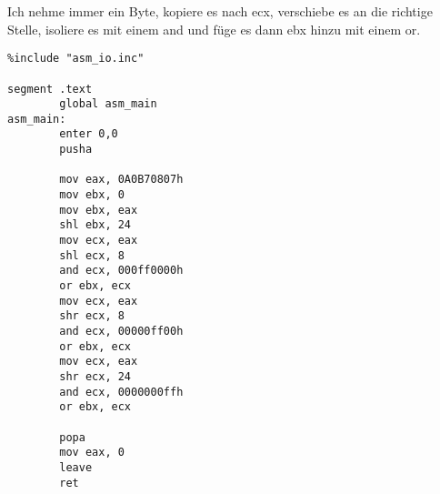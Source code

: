 \documentclass[10pt,a4paper]{article}
\begin{document}
Ich nehme immer ein Byte, kopiere es nach ecx, verschiebe es an die richtige Stelle, isoliere es mit einem and und füge es dann ebx hinzu mit einem or.
\begin{lstlisting}
%include "asm_io.inc"

segment .text
        global asm_main
asm_main:
        enter 0,0
        pusha

        mov eax, 0A0B70807h
        mov ebx, 0
        mov ebx, eax
        shl ebx, 24
        mov ecx, eax
        shl ecx, 8
        and ecx, 000ff0000h
        or ebx, ecx
        mov ecx, eax
        shr ecx, 8
        and ecx, 00000ff00h
        or ebx, ecx
        mov ecx, eax
        shr ecx, 24
        and ecx, 0000000ffh
        or ebx, ecx

        popa
        mov eax, 0
        leave
        ret

\end{lstlisting}
\end{document}
